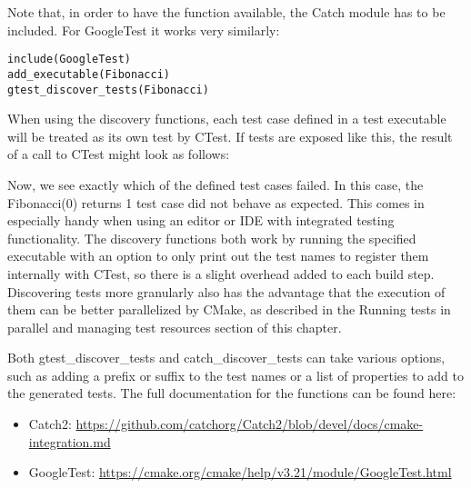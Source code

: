 Note that, in order to have the function available, the Catch module has to be included. For GoogleTest it works very similarly:

\begin{lstlisting}[style=styleCMake]
include(GoogleTest)
add_executable(Fibonacci)
gtest_discover_tests(Fibonacci)
\end{lstlisting}

When using the discovery functions, each test case defined in a test executable will be treated as its own test by CTest. If tests are exposed like this, the result of a call to CTest might look as follows:


Now, we see exactly which of the defined test cases failed. In this case, the Fibonacci(0) returns 1 test case did not behave as expected. This comes in especially handy when using an editor or IDE with integrated testing functionality. The discovery functions both work by running the specified executable with an option to only print out the test names to register them internally with CTest, so there is a slight overhead added to each build step. Discovering tests more granularly also has the advantage that the execution of them can be better parallelized by CMake, as described in the Running tests in parallel and managing test resources section of this chapter.

Both gtest\_discover\_tests and catch\_discover\_tests can take various options, such as adding a prefix or suffix to the test names or a list of properties to add to the generated tests. The full documentation for the functions can be found here:

\begin{itemize}
\item 
Catch2: \url{https://github.com/catchorg/Catch2/blob/devel/docs/cmake-integration.md}
	
\item 
GoogleTest: \url{https://cmake.org/cmake/help/v3.21/module/GoogleTest.html}
\end{itemize}

